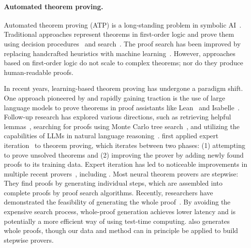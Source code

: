 \paragraph{Automated theorem proving.} 
Automated theorem proving (ATP) is a long-standing problem in symbolic AI~\citep{robinson2001handbook}. Traditional approaches represent theorems in first-order logic and prove them using decision procedures~\citep{de2008z3,barbosa2022cvc5} and search~\citep{kovacs2013first,schulz2019faster}. The proof search has been improved by replacing handcrafted heuristics with machine learning~\citep{urban2011malecop,kaliszyk2018reinforcement}. However, approaches based on first-order logic do not scale to complex theorems; nor do they produce human-readable proofs.



In recent years, learning-based theorem proving has undergone a paradigm shift. One approach pioneered by \citet{polu2020generative} and rapidly gaining traction is the use of large language models to prove theorems in proof assistants like Lean~\citep{de2015lean, moura2021lean} and Isabelle~\citep{paulson1994isabelle}. Follow-up research has explored various directions, such as retrieving helpful lemmas~\citep{irving2016deepmath,mikula2024magnushammer,yang2024leandojo}, searching for proofs using Monte Carlo tree search~\citep{lample2022hypertree}, and utilizing the capabilities of LLMs in natural language reasoning~\citep{jiang2022draft,lin2024lean}. \cite{polu2023formal} first applied expert iteration~\citep{anthony2017thinking} to theorem proving, which iterates between two phases: (1) attempting to prove unsolved theorems and (2) improving the prover by adding newly found proofs to its training data. Expert iteration has led to noticeable improvements in multiple recent provers~\citep{wu2024internlm2,xin2024deepseekv15}, including {\prover}. Most neural theorem provers are stepwise: They find proofs by generating individual steps, which are assembled into complete proofs by proof search algorithms. Recently, researchers have demonstrated the feasibility of generating the whole proof~\citep{first2023baldur,xin2024deepseek,wang2024theoremllama}. By avoiding the expensive search process, whole-proof generation achieves lower latency and is potentially a more efficient way of using test-time computing. {\prover} also generates whole proofs, though our data and method can in principle be applied to build stepwise provers.




